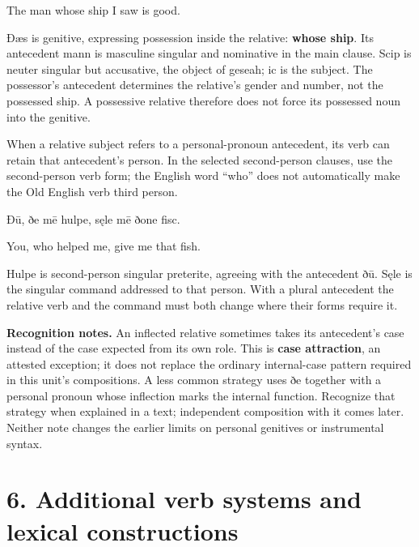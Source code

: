 The man whose ship I saw is good.

Ðæs is genitive, expressing possession inside the relative: \textbf{whose ship}. Its antecedent mann is masculine singular and nominative in the main clause. Scip is neuter singular but accusative, the object of geseah; ic is the subject. The possessor’s antecedent determines the relative’s gender and number, not the possessed ship. A possessive relative therefore does not force its possessed noun into the genitive.

When a relative subject refers to a personal-pronoun antecedent, its verb can retain that antecedent’s person. In the selected second-person clauses, use the second-person verb form; the English word “who” does not automatically make the Old English verb third person.

Ðū, ðe mē hulpe, sęle mē ðone fisc.

You, who helped me, give me that fish.

Hulpe is second-person singular preterite, agreeing with the antecedent ðū. Sęle is the singular command addressed to that person. With a plural antecedent the relative verb and the command must both change where their forms require it.

\textbf{Recognition notes.} An inflected relative sometimes takes its antecedent’s case instead of the case expected from its own role. This is \textbf{case attraction}, an attested exception; it does not replace the ordinary internal-case pattern required in this unit’s compositions. A less common strategy uses ðe together with a personal pronoun whose inflection marks the internal function. Recognize that strategy when explained in a text; independent composition with it comes later. Neither note changes the earlier limits on personal genitives or instrumental syntax.

\section*{6. Additional verb systems and lexical constructions}

